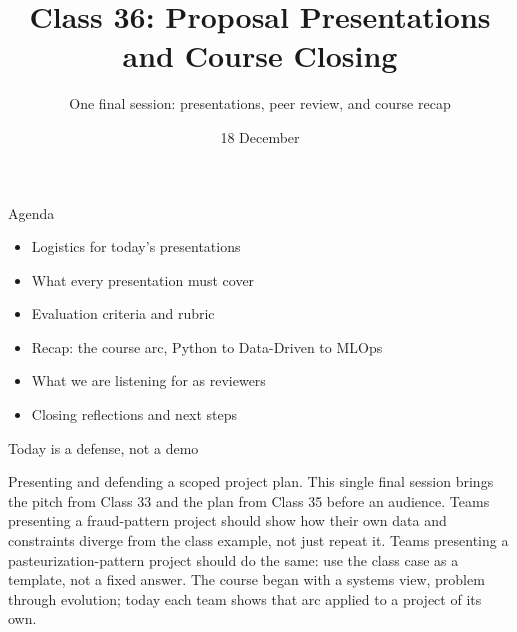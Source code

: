 

\title{Class 36: Proposal Presentations and Course Closing}
\subtitle{One final session: presentations, peer review, and course recap}
\author{\coursename}
\date{18 December}



\frame{\titlepage \coursefooter}

\begin{frame}{Agenda}
\begin{itemize}
\item Logistics for today's presentations
\item What every presentation must cover
\item Evaluation criteria and rubric
\item Recap: the course arc, Python to Data-Driven to MLOps
\item What we are listening for as reviewers
\item Closing reflections and next steps
\end{itemize}
\coursefooter
\end{frame}

\begin{frame}{Today is a defense, not a demo}
\coursefooter
\end{frame}

\coursecontextframe
{Presenting and defending a scoped project plan.}
{This single final session brings the pitch from Class 33 and the plan from Class 35 before an audience.}
{Teams presenting a fraud-pattern project should show how their own data and constraints diverge from the class example, not just repeat it.}
{Teams presenting a pasteurization-pattern project should do the same: use the class case as a template, not a fixed answer.}
{The course began with a systems view, problem through evolution; today each team shows that arc applied to a project of its own.}

